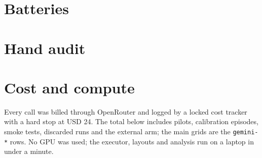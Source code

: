 \section{Batteries}
\label{app:batteries}


\section{Hand audit}
\label{app:audit}

\begin{table}[h]
\centering\small

\caption{Hand-coded wrong trap answers by layout. The per-item codes and notes ship in \texttt{results/audit\_sample.json}.}
\label{tab:audit}
\end{table}

\section{Cost and compute}
\label{app:cost}
Every call was billed through OpenRouter and logged by a locked cost tracker with a hard stop at USD 24. The total below includes pilots, calibration episodes, smoke tests, discarded runs and the external arm; the main grids are the \texttt{gemini-*} rows. No GPU was used; the executor, layouts and analysis run on a laptop in under a minute.
\begin{table}[h]
\centering\small

\caption{Metered spend by model and arm (USD, OpenRouter \texttt{usage.cost}).}
\label{tab:cost}
\end{table}
